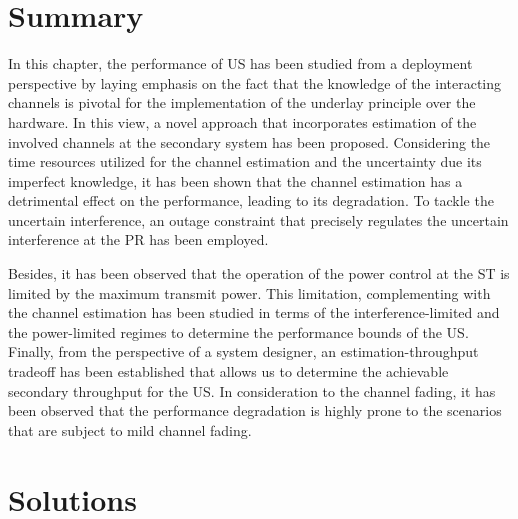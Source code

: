 \section{Summary} \label{sec_US:conc}
In this chapter, the performance of US has been studied from a deployment perspective by laying emphasis on the fact that the knowledge of the interacting channels is pivotal for the implementation of the underlay principle over the hardware. In this view, a novel approach that incorporates estimation of the involved channels at the secondary system has been proposed. Considering the time resources utilized for the channel estimation and the uncertainty due its imperfect knowledge, it has been shown that the channel estimation has a detrimental effect on the performance, leading to its degradation. To tackle the uncertain interference, an outage constraint that precisely regulates the uncertain interference at the PR has been employed. 

Besides, it has been observed that the operation of the power control at the ST is limited by the maximum transmit power. This limitation, complementing with the channel estimation has been studied in terms of the interference-limited and the power-limited regimes to determine the performance bounds of the US. %
Finally, from the perspective of a system designer, an estimation-throughput tradeoff has been established that allows us to determine the achievable secondary throughput for the US. In consideration to the channel fading, it has been observed that the performance degradation is highly prone to the scenarios that are subject to mild channel fading. 

\section{Solutions}
